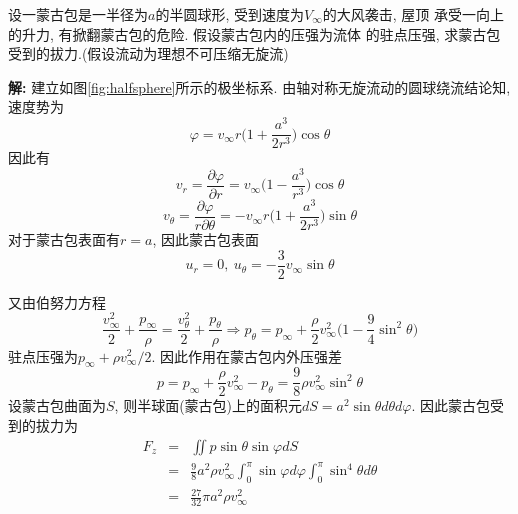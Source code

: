 \begin{problem}[问题6.9]
设一蒙古包是一半径为$a$的半圆球形, 受到速度为$V_\infty$的大风袭击, 屋顶
承受一向上的升力, 有掀翻蒙古包的危险. 假设蒙古包内的压强为流体
的驻点压强, 求蒙古包受到的拔力.(假设流动为理想不可压缩无旋流)
\end{problem}
\begin{solution}
\begin{multicols}{2}
\noindent\textbf{解:} 建立如图\ref{fig:halfsphere}所示的极坐标系. 由轴对称无旋流动的圆球绕流结论知, 速度势为
\[
\varphi = v_\infty r\Big(1+\frac{a^3}{2r^3}\Big)\cos\theta
\]
因此有
\[
v_r = \frac{\partial \varphi}{\partial r} = v_\infty\Big(1-\frac{a^3}{r^3}\Big)\cos\theta
\]
\[
v_\theta = \frac{\partial \varphi}{r\partial\theta} =
-v_\infty r\Big(1+\frac{a^3}{2r^3}\Big)\sin\theta
\]
对于蒙古包表面有$r=a$, 因此蒙古包表面
\[
u_r = 0, {~} u_\theta = -\frac{3}{2}v_\infty\sin\theta
\]

\begin{center}

\label{fig:halfsphere}
\end{center}
\end{multicols}
\noindent 又由伯努力方程
\[
\frac{v_\infty^2}{2} + \frac{p_\infty}{\rho} = \frac{v_\theta^2}{2} + \frac{p_\theta}{\rho} \Longrightarrow p_\theta = p_\infty + \frac{\rho}{2}v_\infty^2\Big(1-\frac{9}{4}\sin^2\theta\Big)
\]
驻点压强为$p_\infty + \rho v_\infty^2/2$. 因此作用在蒙古包内外压强差
\[
p = p_\infty + \frac{\rho}{2} v_\infty^2 - p_\theta = \frac{9}{8}\rho v_\infty^2\sin^2\theta
\]
设蒙古包曲面为$S$, 则半球面(蒙古包)上的面积元$dS = a^2\sin\theta d\theta d\varphi$. 因此蒙古包受到的拔力为
\begin{eqnarray}
F_z &=& \iint p\sin\theta\sin\varphi dS\nonumber\\
    &=& \frac{9}{8}a^2\rho v_\infty^2\int_0^{\pi}\sin\varphi d\varphi  \int_0^{\pi}\sin^4\theta d\theta\nonumber\\
    &=& \frac{27}{32}\pi a^2 \rho v_\infty^2\nonumber
\end{eqnarray}
\end{solution} 
